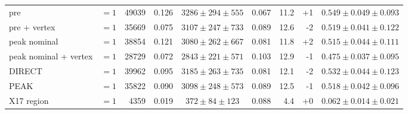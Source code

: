 \begin{table}[H]
\begin{tabular}{llrrcrrrc}
pre & $=1$ & 49039 & 0.126 & $3286\pm294\pm555$ & 0.067 & 11.2 & +1 & $0.549\pm0.049\pm0.093$ \\
pre + vertex & $=1$ & 35669 & 0.075 & $3107\pm247\pm733$ & 0.089 & 12.6 & -2 & $0.519\pm0.041\pm0.122$ \\
peak nominal & $=1$ & 38854 & 0.121 & $3080\pm262\pm667$ & 0.081 & 11.8 & +2 & $0.515\pm0.044\pm0.111$ \\
peak nominal + vertex & $=1$ & 28729 & 0.072 & $2843\pm221\pm571$ & 0.103 & 12.9 & -1 & $0.475\pm0.037\pm0.095$ \\
DIRECT & $=1$ & 39962 & 0.095 & $3185\pm263\pm735$ & 0.081 & 12.1 & -2 & $0.532\pm0.044\pm0.123$ \\
PEAK & $=1$ & 35822 & 0.090 & $3098\pm248\pm573$ & 0.089 & 12.5 & -1 & $0.518\pm0.042\pm0.096$ \\
X17 region & $=1$ & 4359 & 0.019 & $372\pm84\pm123$ & 0.088 & 4.4 & +0 & $0.062\pm0.014\pm0.021$ \\
\bottomrule
\end{tabular}
\end{table}
